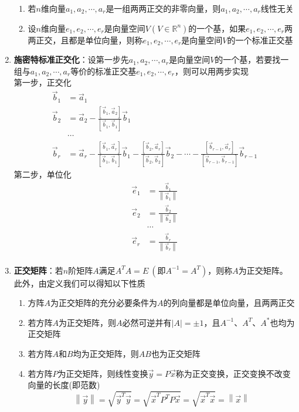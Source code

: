 \documentclass[12pt,a4paper,UTF8]{book}
\begin{document}
\begin{enumerate}
\begin{enumerate}
\item 若$n$维向量$a_1,a_2,\cdots,a_r$是一组两两正交的非零向量，则$a_1,a_2,\cdots,a_r$线性无关
\item 设$n$维向量$e_1,e_2,\cdots,e_r$是向量空间$V\left(V\in\mathbb{R}^n\right)$的一个基，如果$e_1,e_2,\cdots,e_r$两两正交，且都是单位向量，则称$e_1,e_2,\cdots,e_r$是向量空间$V$的一个标准正交基
\end{enumerate}
\item \textbf{施密特标准正交化}：设第一步先$a_1,a_2,\cdots,a_r$是向量空间$V$的一个基，若要找一组与$a_1,a_2,\cdots,a_r$等价的标准正交基$e_1,e_2,\cdots,e_r$，则可以用两步实现\\
第一步，正交化
\[\begin{aligned}
\vec{b}_1&=\vec{a}_1\\
\vec{b}_2&=\vec{a}_2-\frac{\left[\vec{b}_1,\vec{a}_2\right]}{\left[\vec{b}_1,\vec{b}_1\right]}\vec{b}_1\\
&\cdots\\
\vec{b}_r&=\vec{a}_r-\frac{\left[\vec{b}_1,\vec{a}_r\right]}{\left[\vec{b}_1,\vec{b}_1\right]}\vec{b}_1-\frac{\left[\vec{b}_2,\vec{a}_r\right]}{\left[\vec{b}_2,\vec{b}_2\right]}\vec{b}_2-\cdots-\frac{\left[\vec{b}_{r-1},\vec{a}_r\right]}{\left[\vec{b}_{r-1},\vec{b}_{r-1}\right]}\vec{b}_{r-1}
\end{aligned}\]
第二步，单位化
\[\begin{aligned}
\vec{e}_1&=\frac{\vec{b}_1}{\left\|\vec{b}_1\right\|}\\
\vec{e}_2&=\frac{\vec{b}_2}{\left\|\vec{b}_2\right\|}\\
&\cdots\\
\vec{e}_r&=\frac{\vec{b}_r}{\left\|\vec{b}_r\right\|}\\
\end{aligned}\]
\item \textbf{正交矩阵}：若$n$阶矩阵$A$满足$A^TA=E\ \left(\text{即}A^{-1}=A^T\right)$，则称$A$为正交矩阵。此外，由定义我们可以得知以下性质
\begin{enumerate}
\item 方阵$A$为正交矩阵的充分必要条件为$A$的列向量都是单位向量，且两两正交
\item 若方阵$A$为正交矩阵，则$A$必然可逆并有$\left|A\right|=\pm1$，且$A^{-1}$、$A^T$、$A^*$也均为正交矩阵
\item 若方阵$A$和$B$均为正交矩阵，则$AB$也为正交矩阵
\item 若方阵$P$为正交矩阵，则线性变换$\vec{y}=P\vec{x}$称为正交变换，正交变换不改变向量的长度(即范数)
\[\left\|\vec{y}\right\|=\sqrt{\vec{y}^T\vec{y}}=\sqrt{\vec{x}^TP^TP\vec{x}}=\sqrt{\vec{x}^T\vec{x}}=\left\|\vec{x}\right\|\]
\end{enumerate}
\end{enumerate}
\end{document}
